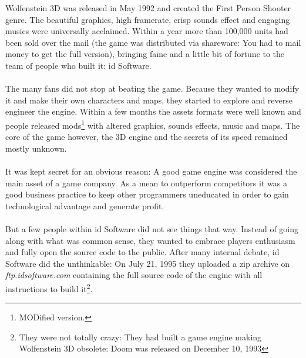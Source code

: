 Wolfenstein 3D was released in May 1992 and created the First Person Shooter genre. The beautiful graphics, high framerate, crisp sounds effect and engaging musics were universally acclaimed. Within a year more than 100,000 units had been sold over the mail (the game was distributed via shareware: You had to mail money to get the full version), bringing fame and a little bit of fortune to the team of people who built it: id Software.\\
\\
The many fans did not stop at beating the game. Because they wanted to modify it and make their own characters and maps, they started to explore and reverse engineer the engine. Within a few months the assets formats were well known and people released mods\footnote{MODified version.} with altered graphics, sounds effects, music and maps. The core of the game however, the 3D engine and the secrets of its speed remained mostly unknown.\\
\\
It was kept secret for an obvious reason: A good game engine was considered the main asset of a game company. As a mean to outperform competitors it was a good business practice to keep other programmers  uneducated in order to gain technological advantage and generate profit.\\
\\
But a few people within id Software did not see things that way. Instead of going along with what was common sense, they wanted to embrace players enthusiasm and fully open the source code to the public. After many internal debate, id Software did the unthinkable: On July 21, 1995 they uploaded a zip archive on \emph{ftp.idsoftware.com} containing the full source code of the engine with all instructions to build it\footnote{They were not totally crazy: They had built a game engine making Wolfenstein 3D obsolete: Doom was released on December 10, 1993}.\\

